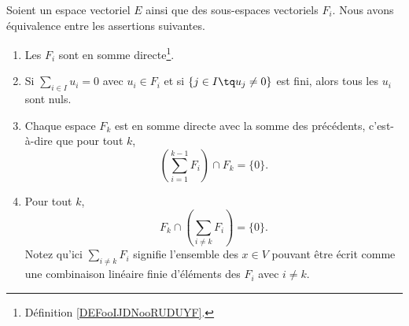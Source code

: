 \begin{lemma}         \label{LEMooDQMQooInVVDY}
	Soient un espace vectoriel \( E\) ainsi que des sous-espaces vectoriels \( F_i\). Nous avons équivalence entre les assertions suivantes.
	\begin{enumerate}
		\item		\label{ITEMooHJXIooQKAfBe}
		      Les \( F_i\) sont en somme directe\footnote{Définition \ref{DEFooIJDNooRUDUYF}.}.
		\item		\label{ITEMooJFOFooGDlwUz}
		      Si \( \sum_{i\in I}u_i=0\) avec \( u_i\in F_i\) et si \( \{ j\in I\tq u_j\neq 0 \}\) est fini, alors tous les \( u_i\) sont nuls.
		\item		\label{ITEMooNFWVooNdhhid}
		      Chaque espace \( F_k\) est en somme directe avec la somme des précédents, c'est-à-dire que pour tout \( k\),
		      \begin{equation}
			      \left( \sum_{i=1}^{k-1}F_i \right)\cap F_k=\{ 0 \}.
		      \end{equation}
		\item   \label{ITEMooPLXGooCOQgen}
		      Pour tout \( k\),
		      \begin{equation}
			      F_k\cap\left( \sum_{i\neq k}F_i \right)=\{ 0 \}.
		      \end{equation}
		      Notez qu'ici \( \sum_{i\neq k}F_i\) signifie l'ensemble des \( x\in V\) pouvant être écrit comme une combinaison linéaire finie d'éléments des \( F_i\) avec \( i\neq k\).
	\end{enumerate}
\end{lemma}


